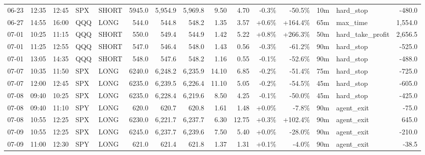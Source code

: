 \documentclass[11pt,a4paper,twoside]{article}
\begin{document}
\begin{landscape}
\begin{center}
\begin{longtable}{>{\color{txtmain}}l l l l l r r r r r r r r >{\color{txtmain}}l r}
06-23 & 12:35 & 12:45 & SPX & SHORT & 5945.0 & 5,954.9 & 5,969.8 & 9.50 & 4.70 & \textcolor{lossred}{-0.3\%} & \textcolor{lossred}{-50.5\%} & 10m & hard\_stop & \textcolor{lossred}{-480.0} \\
06-27 & 14:55 & 16:00 & QQQ & LONG & 544.0 & 544.8 & 548.2 & 1.35 & 3.57 & \textcolor{wingreen}{+0.6\%} & \textcolor{wingreen}{+164.4\%} & 65m & max\_time & \textcolor{wingreen}{1,554.0} \\
07-01 & 10:25 & 11:15 & QQQ & SHORT & 550.0 & 549.4 & 544.9 & 1.42 & 5.22 & \textcolor{wingreen}{+0.8\%} & \textcolor{wingreen}{+266.3\%} & 50m & hard\_take\_profit & \textcolor{wingreen}{2,656.5} \\
07-01 & 11:25 & 12:55 & QQQ & SHORT & 547.0 & 546.4 & 548.0 & 1.43 & 0.56 & \textcolor{lossred}{-0.3\%} & \textcolor{lossred}{-61.2\%} & 90m & hard\_stop & \textcolor{lossred}{-525.0} \\
07-01 & 13:05 & 14:35 & QQQ & SHORT & 548.0 & 547.6 & 548.2 & 1.16 & 0.55 & \textcolor{lossred}{-0.1\%} & \textcolor{lossred}{-52.6\%} & 90m & hard\_stop & \textcolor{lossred}{-488.0} \\
07-07 & 10:35 & 11:50 & SPX & LONG & 6240.0 & 6,248.2 & 6,235.9 & 14.10 & 6.85 & \textcolor{lossred}{-0.2\%} & \textcolor{lossred}{-51.4\%} & 75m & hard\_stop & \textcolor{lossred}{-725.0} \\
07-07 & 12:00 & 12:45 & SPX & LONG & 6235.0 & 6,239.5 & 6,226.4 & 11.10 & 5.05 & \textcolor{lossred}{-0.2\%} & \textcolor{lossred}{-54.5\%} & 45m & hard\_stop & \textcolor{lossred}{-605.0} \\
07-08 & 09:40 & 10:25 & SPX & LONG & 6235.0 & 6,228.4 & 6,219.6 & 8.50 & 4.25 & \textcolor{lossred}{-0.1\%} & \textcolor{lossred}{-50.0\%} & 45m & hard\_stop & \textcolor{lossred}{-425.0} \\
07-08 & 09:40 & 11:10 & SPY & LONG & 620.0 & 620.7 & 620.8 & 1.61 & 1.48 & \textcolor{wingreen}{+0.0\%} & \textcolor{lossred}{-7.8\%} & 90m & agent\_exit & \textcolor{lossred}{-75.0} \\
07-08 & 10:55 & 12:25 & SPX & LONG & 6230.0 & 6,221.7 & 6,237.7 & 6.30 & 12.75 & \textcolor{wingreen}{+0.3\%} & \textcolor{wingreen}{+102.4\%} & 90m & agent\_exit & \textcolor{wingreen}{645.0} \\
07-09 & 10:55 & 12:25 & SPX & LONG & 6245.0 & 6,237.7 & 6,239.6 & 7.50 & 5.40 & \textcolor{wingreen}{+0.0\%} & \textcolor{lossred}{-28.0\%} & 90m & agent\_exit & \textcolor{lossred}{-210.0} \\
07-09 & 11:00 & 12:30 & SPY & LONG & 621.0 & 621.4 & 621.8 & 1.37 & 1.31 & \textcolor{wingreen}{+0.1\%} & \textcolor{lossred}{-4.0\%} & 90m & agent\_exit & \textcolor{lossred}{-38.5} \\

\end{longtable}
\end{center}
\end{landscape}
\end{document}
